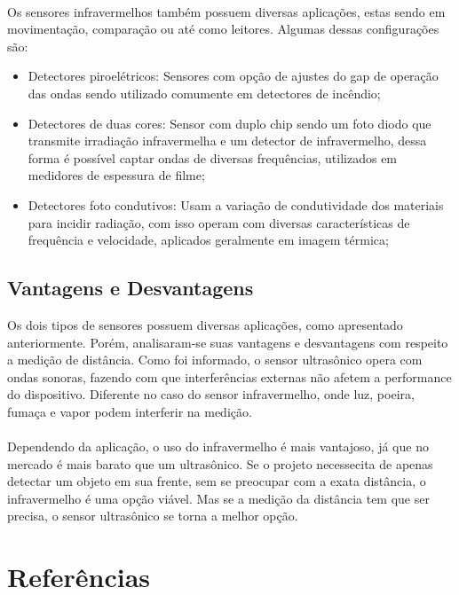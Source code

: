 \usepackage{}\documentclass[a4paper, 12pt]{article}
\begin{document}
\paragraph{} Os sensores infravermelhos também possuem diversas aplicações, estas sendo em movimentação, comparação ou até como leitores. Algumas dessas configurações são:
\begin{itemize}

    \item Detectores piroelétricos: Sensores com opção de ajustes do gap de operação das ondas sendo utilizado comumente em detectores de incêndio;
    
    \item Detectores de duas cores: Sensor com duplo chip sendo um foto diodo que transmite irradiação infravermelha e um detector de infravermelho, dessa forma é possível captar ondas de diversas frequências, utilizados em medidores de espessura de filme;
    
    \item Detectores foto condutivos: Usam a variação de condutividade dos materiais para incidir radiação, com isso operam com diversas características de frequência e velocidade, aplicados geralmente em imagem térmica;
    
\end{itemize}

\subsection{Vantagens e Desvantagens}

Os dois tipos de sensores possuem diversas aplicações, como apresentado anteriormente. Porém, analisaram-se suas vantagens e desvantagens com respeito a medição de distância. Como foi informado, o sensor ultrasônico opera com ondas sonoras, fazendo com que interferências externas não afetem a performance do dispositivo. Diferente no caso do sensor infravermelho, onde luz, poeira, fumaça e vapor podem interferir na medição. 

\paragraph{}Dependendo da aplicação, o uso do infravermelho é mais vantajoso, já que no mercado é mais barato que um ultrasônico. Se o projeto necessecita de apenas detectar um objeto em sua frente, sem se preocupar com a exata distância, o infravermelho é uma opção viável. Mas se a  medição da distância tem que ser precisa, o sensor ultrasônico se torna a melhor opção.




\section{Referências}
%
%
%
%
\printbibliography
\end{document}
